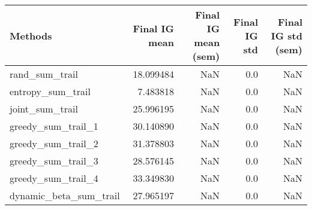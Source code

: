 \begin{tabular}{lrrrr}
\toprule
                Methods &  Final IG mean &  Final IG mean (sem) &  Final IG std &  Final IG std (sem) \\
\midrule
         rand\_sum\_trail &      18.099484 &                  NaN &           0.0 &                 NaN \\
      entropy\_sum\_trail &       7.483818 &                  NaN &           0.0 &                 NaN \\
        joint\_sum\_trail &      25.996195 &                  NaN &           0.0 &                 NaN \\
     greedy\_sum\_trail\_1 &      30.140890 &                  NaN &           0.0 &                 NaN \\
     greedy\_sum\_trail\_2 &      31.378803 &                  NaN &           0.0 &                 NaN \\
     greedy\_sum\_trail\_3 &      28.576145 &                  NaN &           0.0 &                 NaN \\
     greedy\_sum\_trail\_4 &      33.349830 &                  NaN &           0.0 &                 NaN \\
 dynamic\_beta\_sum\_trail &      27.965197 &                  NaN &           0.0 &                 NaN \\
\bottomrule
\end{tabular}

